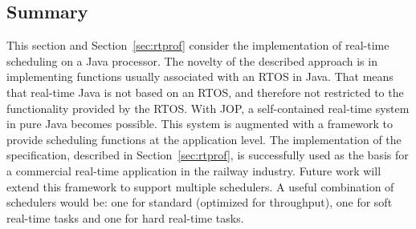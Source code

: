 \subsection{Summary}

This section and Section~\ref{sec:rtprof} consider the
implementation of real-time scheduling on a Java processor. The
novelty of the described approach is in implementing functions
usually associated with an RTOS in Java. That means that real-time
Java is not based on an RTOS, and therefore not restricted to the
functionality provided by the RTOS. With JOP, a self-contained
real-time system in pure Java becomes possible. This system is
augmented with a framework to provide scheduling functions at the
application level. The implementation of the specification,
described in Section~\ref{sec:rtprof}, is successfully used as the
basis for a commercial real-time application in the railway
industry. Future work will extend this framework to support multiple
schedulers. A useful combination of schedulers would be: one for
standard  (optimized for throughput), one for
soft real-time tasks and one for hard real-time tasks.
